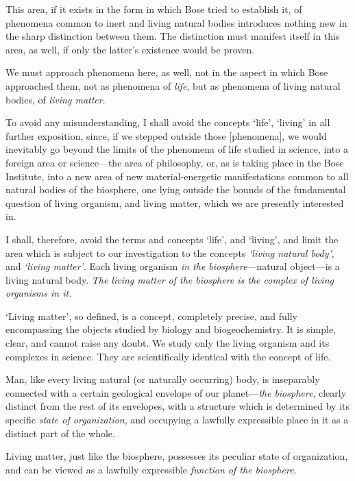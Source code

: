 This area, if it exists in the form in which Bose tried to establish it, of
phenomena common to inert and living natural bodies introduces nothing new in
the sharp distinction between them.  The distinction must manifest itself in
this area, as well, if only the latter's existence would be proven.

We must approach phenomena here, as well, not in the aspect in which Bose
approached them, not as phenomena of \emph{life}, but as phenomena of living
natural bodies, of \emph{living matter}.

To avoid any misunderstanding, I shall avoid the concepts `life', `living' in
all further exposition, since, if we stepped outside those
[phenomena], we would inevitably
go beyond the limits of the phenomena of life studied in science, into a
foreign area or science---the area of philosophy, or, as is taking place in the
Bose Institute, into a new area of new material-energetic manifestations common
to all natural bodies of the biosphere, one lying outside the bounds of the
fundamental question of living organism, and living matter, which we are
presently interested in.

I shall, therefore, avoid the terms and concepts `life', and `living', and
limit the area which is subject to our investigation to the concepts
\emph{`living natural body'}, and \emph{`living matter'}.  Each living organism
\emph{in the biosphere}---natural object---is a living natural body.  \emph{The
living matter of the biosphere is the complex of living organisms in it.}

`Living matter', so defined, is a concept, completely precise, and fully
encompassing the objects studied by biology and biogeochemistry.  It is simple,
clear, and cannot raise any doubt.  We study only the living organism and its
complexes in science.  They are scientifically identical with the concept of
life.


\Section %
Man, like every living natural (or naturally occurring) body, is inseparably connected with a certain geological
envelope of our planet---\emph{the biosphere}, clearly distinct from the rest
of its envelopes, with a structure which is determined by its specific
\emph{state of organization}, and occupying a
lawfully expressible place in it as a distinct part of the whole.

Living matter, just like the biosphere, possesses its peculiar state of
organization, and can be viewed as a lawfully expressible \emph{function of the
biosphere.}

